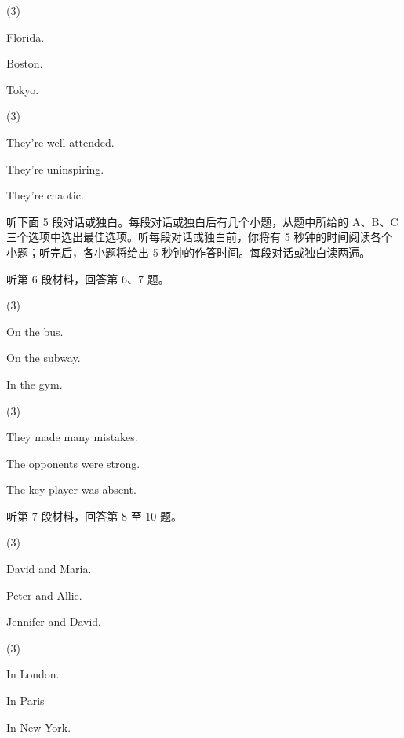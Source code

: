 \documentclass{英语试卷}
\begin{document}
\begin{choices}(3)
  \item Florida.
  \item Boston.
  \item Tokyo.
\end{choices}
\begin{choices}(3)
  \item They're well attended.
  \item They're uninspiring.
  \item They're chaotic.
\end{choices}
\par 听下面 5 段对话或独白。每段对话或独白后有几个小题，从题中所给的 A、B、C 三个选项中选出最佳选项。听每段对话或独白前，你将有 5 秒钟的时间阅读各个小题；听完后，各小题将给出 5 秒钟的作答时间。每段对话或独白读两遍。\par
\par 听第 6 段材料，回答第 6、7 题。\par
{}
\begin{choices}(3)
  \item On the bus.
  \item On the subway.
  \item In the gym.
\end{choices}
\begin{choices}(3)
  \item They made many mistakes.
  \item The opponents were strong.
  \item The key player was absent.
\end{choices}
\par 听第 7 段材料，回答第 8 至 10 题。\par
{}
\begin{choices}(3)
  \item David and Maria.
  \item Peter and Allie.
  \item Jennifer and David.
\end{choices}
\begin{choices}(3)
  \item In London.
  \item In Paris
  \item In New York.
\end{choices}
\end{document}
